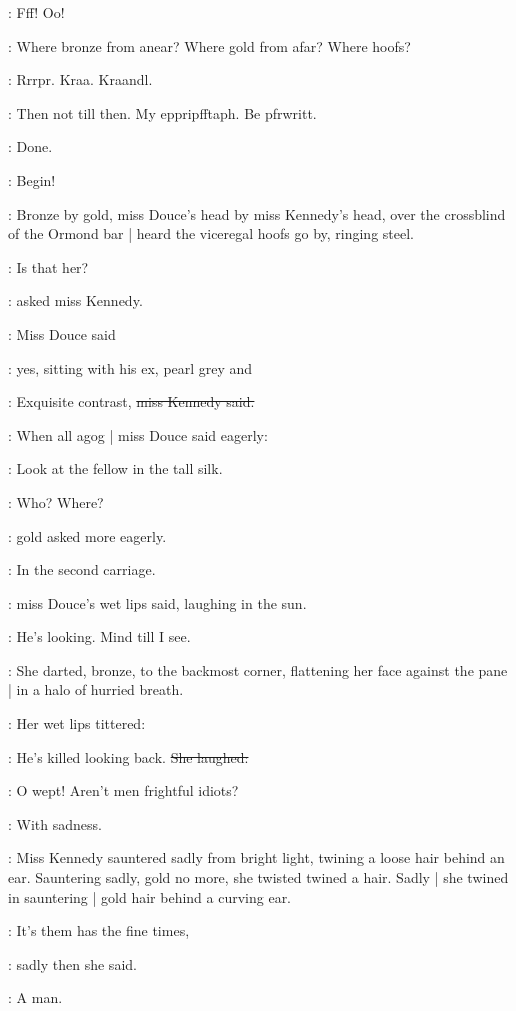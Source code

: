 :
Fff!
Oo!

\BloomInt:
Where bronze from anear?
Where gold from afar?
Where hoofs?

:
Rrrpr.
Kraa.
Kraandl.

\emmet:
Then not till then.
My eppripfftaph.
Be pfrwritt.

\BloomInt:
Done.

\BloomInt:
Begin!

\pagebreak


:
Bronze by gold,
miss Douce's head by miss Kennedy's head,
over the crossblind of the Ormond bar |
heard the viceregal hoofs go by,
ringing steel.

\MissK:
Is that her?

:
asked miss Kennedy.

:
Miss Douce said

\MissD:
yes,
sitting with his ex,
pearl grey and 

\MissK:
Exquisite contrast,
\sout{miss Kennedy said.}

:
When all agog |
miss Douce said eagerly:

\MissD:
Look at the fellow
in the tall silk.

\MissK:
Who?
Where?

:
gold asked more eagerly.

\MissD:
In the second carriage.

:
miss Douce's wet lips said,
laughing in the sun.

\MissD:
He's looking.
Mind till I see.

:
She darted,
bronze,
to the backmost corner,
flattening her face against the pane |
in a halo of hurried breath.

:
Her wet lips tittered:

\MissD:
He's killed looking back.
\stage{[laughs]}
\sout{She laughed:}

\MissD:
O wept!
Aren't men frightful idiots?

:
With sadness.

:
Miss Kennedy sauntered sadly from bright light,
twining a loose hair behind an ear.
Sauntering sadly,
gold no more,
she twisted twined a hair.
Sadly |
she twined in sauntering |
gold hair behind a curving ear.

\MissK:
It's them has the fine times,

:
sadly then she said.

:
A man.

